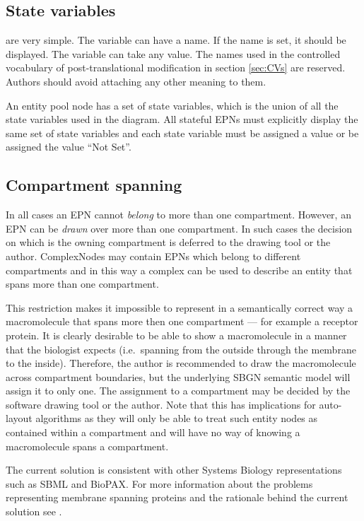\subsection{State variables}

 are very simple. The variable can have a name. If the
name is set, it should be displayed. The variable can take any
value. The names used in the controlled vocabulary of
post-translational modification in section \ref{sec:CVs} are
reserved. Authors should avoid attaching any other meaning to them.

An entity pool node has a set of state variables, which is the union
of all the state variables used in the diagram. 
All stateful EPNs must explicitly display the same set of
state variables and each state variable must be assigned a value or be
assigned the value ``Not Set''.

\subsection{Compartment spanning}

In all cases an EPN cannot \emph{belong} to more than one
compartment. However, an EPN can be \emph{drawn} over more than one
compartment. In such cases the decision on which is the owning
compartment is deferred to the drawing tool or the
author. ComplexNodes may contain EPNs which belong to different
compartments and in this way a complex can be used to describe an
entity that spans more than one compartment.

This restriction makes it impossible to represent in a semantically
correct way a macromolecule that spans more then one compartment ---
for example a receptor protein. It is clearly desirable to be able to
show a macromolecule in a manner that the biologist expects (i.e.\,
spanning from the outside through the membrane to the
inside). Therefore, the author is recommended to draw the
macromolecule across compartment boundaries, but the underlying SBGN
semantic model will assign it to only one. The assignment to a
compartment may be decided by the software drawing tool or the
author. Note that this has implications for auto-layout algorithms as
they will only be able to treat such entity nodes as contained within
a compartment and will have no way of knowing a macromolecule spans a
compartment.

The current solution is consistent with other Systems Biology
representations such as SBML and BioPAX. For more information about the
problems representing membrane spanning proteins and the rationale
behind the current solution see .

